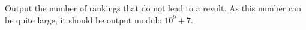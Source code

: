 
  Output the number of rankings that do not lead to a revolt. As
  this number can be quite large, it should be output modulo
  $10^9+7$.
